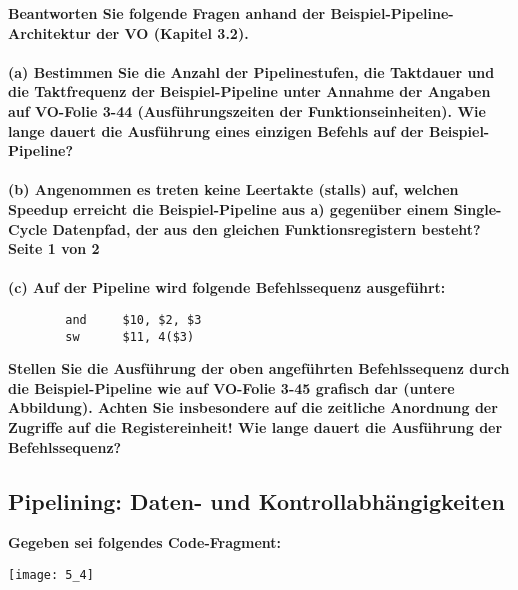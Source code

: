 \documentclass[11pt]{article}
\begin{document}
    \textbf{Beantworten Sie folgende Fragen anhand der Beispiel-Pipeline-Architektur der VO (Kapitel 3.2).\\\\
    (a) Bestimmen Sie die Anzahl der Pipelinestufen, die Taktdauer und die Taktfrequenz der
    Beispiel-Pipeline unter Annahme der Angaben auf VO-Folie 3-44 (Ausführungszeiten der
    Funktionseinheiten). Wie lange dauert die Ausführung eines einzigen Befehls auf der
    Beispiel-Pipeline?\\\\
    (b) Angenommen es treten keine Leertakte (stalls) auf, welchen Speedup erreicht die
    Beispiel-Pipeline aus a) gegenüber einem Single-Cycle Datenpfad, der aus den gleichen
    Funktionsregistern besteht?\\
    Seite 1 von 2\\\\
    (c) Auf der Pipeline wird folgende Befehlssequenz ausgeführt:\\}
    \begin{verbatim}
        and     $10, $2, $3
        sw      $11, 4($3)
    \end{verbatim}

    \textbf{    Stellen Sie die Ausführung der oben angeführten Befehlssequenz durch die Beispiel-Pipeline
    wie auf VO-Folie 3-45 grafisch dar (untere Abbildung). Achten Sie insbesondere auf die
    zeitliche Anordnung der Zugriffe auf die Registereinheit! Wie lange dauert die Ausführung der
    Befehlssequenz?}


    \subsection{Pipelining: Daten- und Kontrollabhängigkeiten}
    \textbf{Gegeben sei folgendes Code-Fragment:}

    \begin{center}
        
    \texttt{[image: 5\_4]}
    
    \end{center}
\end{document}
